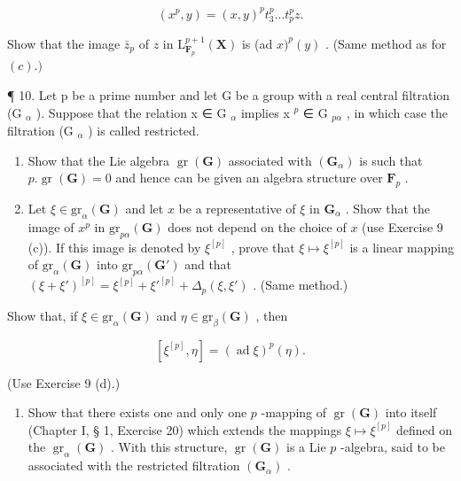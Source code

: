 \[
(x ^ {p}, y) = (x, y) ^ {p} t _ {3} ^ {p} \dots t _ {p} ^ {p} z.
\]

Show that the image \(\bar{z}_p\) of \(z\) in \(\mathrm{L}_{\mathbf{F}_p}^{p + 1}(\mathbf{X})\) is (ad \(x)^p (y)\) . (Same method as for \((c).)\)

¶ 10. Let p be a prime number and let G be a group with a real central filtration (G \(_{\alpha}\) ). Suppose that the relation x ∈ G \(_{\alpha}\) implies x \(^{p}\) ∈ G \(_{p\alpha}\) , in which case the filtration (G \(_{\alpha}\) ) is called restricted.

\begin{enumerate}
\def\labelenumi{(\alph{enumi})}
\item
  Show that the Lie algebra \(\operatorname{gr}(\mathbf{G})\) associated with \((\mathbf{G}_{\alpha})\) is such that \(p.\operatorname{gr}(\mathbf{G}) = 0\) and hence can be given an algebra structure over \(\mathbf{F}_p\) .
\item
  Let \(\xi \in \mathrm{gr}_{\alpha}(\mathbf{G})\) and let \(x\) be a representative of \(\xi\) in \(\mathbf{G}_{\alpha}\) . Show that the image of \(x^{p}\) in \(\mathrm{gr}_{p\alpha}(\mathbf{G})\) does not depend on the choice of \(x\) (use Exercise 9 (c)). If this image is denoted by \(\xi^{[p]}\) , prove that \(\xi \mapsto \xi^{[p]}\) is a linear mapping of \(\mathrm{gr}_{\alpha}(\mathbf{G})\) into \(\mathrm{gr}_{p\alpha}(\mathbf{G}')\) and that \((\xi + \xi')^{[p]} = \xi^{[p]} + \xi'^{[p]} + \Delta_p(\xi, \xi')\) . (Same method.)
\end{enumerate}

Show that, if \(\xi \in \mathrm{gr}_{\alpha}(\mathbf{G})\) and \(\eta \in \mathrm{gr}_{\beta}(\mathbf{G})\) , then

\[
[ \xi^ {[ p ]}, \eta ] = (\operatorname{ad} \xi) ^ {p} (\eta).
\]

(Use Exercise 9 (d).)

\begin{enumerate}
\def\labelenumi{(\alph{enumi})}
\setcounter{enumi}{2}
\tightlist
\item
  Show that there exists one and only one \(p\) -mapping of \(\operatorname{gr}(\mathbf{G})\) into itself (Chapter I, § 1, Exercise 20) which extends the mappings \(\xi \mapsto \xi^{[p]}\) defined on the \(\operatorname{gr}_{\alpha}(\mathbf{G})\) . With this structure, \(\operatorname{gr}(\mathbf{G})\) is a Lie \(p\) -algebra, said to be associated with the restricted filtration \((\mathbf{G}_{\alpha})\) .
\end{enumerate}

